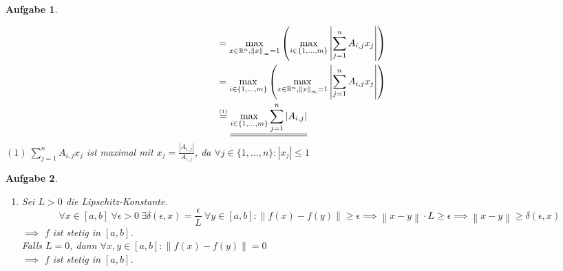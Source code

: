 \documentclass[11pt]{article}
\theoremstyle{break}
\newtheorem{task}{Aufgabe}
\newcommand{\set}[1]{\ensuremath{\{#1\}}}
\newcommand{\abs}[1]{\ensuremath{\left\vert #1 \right\vert}}
\newcommand{\norm}[1]{\ensuremath{\left\| #1 \right\|}}
\newcommand{\R}{\ensuremath{\mathbb{R}}}
\begin{document}
\begin{task}
\begin{enumerate} [label={(\alph*)}]
\begin{align*}
            &= \max\limits_{x\in \R^n, \norm{x}_\infty = 1}\left(\max\limits_{i\in\set{1,\dots,m}}\abs{\sum\limits_{j=1}^n A_{i,j}x_j}\right)\\
            &= \max\limits_{i\in\set{1,\dots,m}}\left(\max\limits_{x\in \R^n, \norm{x}_\infty = 1}\abs{\sum\limits_{j=1}^n A_{i,j}x_j}\right)\\
            &\stackrel{\mbox{\tiny (1)}}{=} \underline{\underline{\max\limits_{i\in\set{1,\dots,m}}\sum\limits_{j=1}^n \abs{A_{i,j}}}}
        \end{align*}
        $(1)\ \sum\limits_{j=1}^n A_{i,j}x_j$ ist maximal mit $x_j = \frac{\abs{A_{i,j}}}{A_{i,j}}$, da $\forall j\in\set{1,\dots,n}:\abs{x_j}\leq 1$
    \end{enumerate}
\end{task}

\begin{task}
    \hfill\vspace{-5mm}
    \begin{enumerate} [label={(\alph*)}]
        \item Sei $L>0$ die Lipschitz-Konstante. $$\forall x\in [a,b]\ \forall \epsilon>0\ \exists \delta(\epsilon, x)=\frac{\epsilon}{L}\ \forall y\in [a,b]: \norm{f(x)-f(y)} \geq \epsilon \implies \norm{x-y}\cdot L \geq \epsilon \implies \norm{x-y}\geq\delta(\epsilon, x)$$
        $\implies$ $f$ ist stetig in $[a,b]$.\vspace{3mm}\\
        Falls $L=0$, dann $\forall x,y\in [a,b]: \norm{f(x)-f(y)}=0$\\
        $\implies$ $f$ ist stetig in $[a,b]$.
    \end{enumerate}
\end{task}
\end{document}
